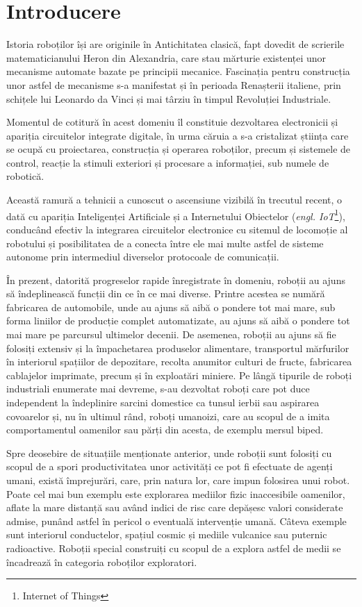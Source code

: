 \chapter{Introducere}

Istoria roboților își are originile în Antichitatea clasică, fapt dovedit de scrierile matematicianului Heron din Alexandria, care stau mărturie existenței unor mecanisme automate \cite{heron} bazate pe principii mecanice. Fascinația pentru construcția unor astfel de mecanisme s-a manifestat și în perioada Renașterii italiene, prin schițele lui Leonardo da Vinci și mai târziu în timpul Revoluției Industriale.

Momentul de cotitură în acest domeniu îl constituie dezvoltarea electronicii și apariția circuitelor integrate digitale, în urma căruia a s-a cristalizat știința care se ocupă cu proiectarea, construcția și operarea roboților, precum și sistemele de control, reacție la stimuli exteriori și procesare a informației, sub numele de robotică.

Această ramură a tehnicii a cunoscut o ascensiune vizibilă în trecutul recent, o dată cu apariția Inteligenței Artificiale și a Internetului Obiectelor (\textit{engl. IoT}\footnote{Internet of Things}), conducând efectiv la integrarea circuitelor electronice cu sitemul de locomoție al robotului și posibilitatea de a conecta între ele mai multe astfel de sisteme autonome prin intermediul diverselor protocoale de comunicații.

În prezent, datorită progreselor rapide înregistrate în domeniu, roboții au ajuns să îndeplinească funcții din ce în ce mai diverse. Printre acestea se numără fabricarea de automobile, unde au ajuns să aibă o pondere tot mai mare, sub forma liniilor de producție complet automatizate, au ajuns să aibă o pondere tot mai mare pe parcursul ultimelor decenii. De asemenea, roboții au ajuns să fie folosiți extensiv și la împachetarea produselor alimentare, transportul mărfurilor în interiorul spațiilor de depozitare, recolta anumitor culturi de fructe, fabricarea cablajelor imprimate, precum și în exploatări miniere. Pe lângă tipurile de roboți industriali enumerate mai devreme, s-au dezvoltat roboți care pot duce independent la îndeplinire sarcini domestice ca tunsul ierbii sau aspirarea covoarelor și, nu în ultimul rând, roboți umanoizi, care au scopul de a imita comportamentul oamenilor sau părți din acesta, de exemplu mersul biped.

Spre deosebire de situațiile menționate anterior, unde roboții sunt folosiți cu scopul de a spori productivitatea unor activități ce pot fi efectuate de agenți umani, există împrejurări, care, prin natura lor, care impun folosirea unui robot. Poate cel mai bun exemplu este explorarea mediilor fizic inaccesibile oamenilor, aflate la mare distanță sau  având indici de risc care depășesc valori considerate admise, punând astfel în pericol o eventuală intervenție umană. Câteva exemple sunt interiorul conductelor, spațiul cosmic și mediile vulcanice sau puternic radioactive. Roboții special construiți cu scopul de a explora astfel de medii se încadrează în categoria roboților exploratori.


